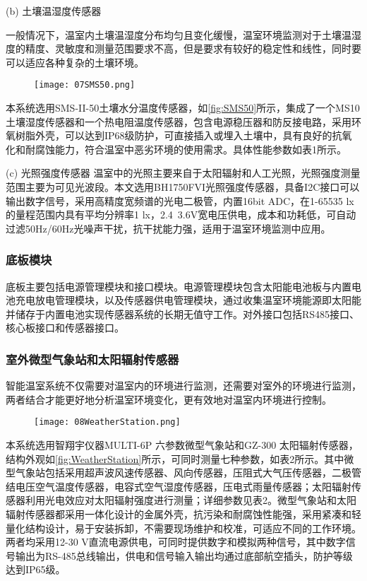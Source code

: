 		(b) 土壤温湿度传感器
		
		一般情况下，温室内土壤温湿度分布均匀且变化缓慢，温室环境监测对于土壤温湿度的精度、灵敏度和测量范围要求不高，但是要求有较好的稳定性和线性，同时要可以适应各种复杂的土壤环境。
  		\begin{figure}[!htp]
  			\centering
 			\texttt{[image: 07SMS50.png]}
		\end{figure}
		本系统选用SMS-II-50土壤水分温度传感器，如\ref{fig:SMS50}所示，集成了一个MS10土壤湿度传感器和一个热电阻温度传感器，包含电源稳压器和防反接电路，采用环氧树脂外壳，可以达到IP68级防护，可直接插入或埋入土壤中，具有良好的抗氧化和耐腐蚀能力，符合温室中恶劣环境的使用需求。具体性能参数如表1所示。

		(c) 光照强度传感器
温室中的光照主要来自于太阳辐射和人工光照，光照强度测量范围主要为可见光波段。本文选用BH1750FVI光照强度传感器，具备I2C接口可以输出数字信号，采用高精度宽频谱的光电二极管，内置16bit ADC，在1-65535 lx的量程范围内具有平均分辨率1 lx，2.4~3.6V宽电压供电，成本和功耗低，可自动过滤50Hz/60Hz光噪声干扰，抗干扰能力强，适用于温室环境监测中应用。

		\subsubsection{底板模块}
		底板主要包括电源管理模块和接口模块。电源管理模块包含太阳能电池板与内置电池充电放电管理模块，以及传感器供电管理模块，通过收集温室环境能源即太阳能并储存于内置电池实现传感器系统的长期无值守工作。对外接口包括RS485接口、核心板接口和传感器接口。	
		
		\subsubsection{室外微型气象站和太阳辐射传感器}
		智能温室系统不仅需要对温室内的环境进行监测，还需要对室外的环境进行监测，两者结合才能更好地分析温室环境变化，更有效地对温室内环境进行控制。
  		\begin{figure}[!htp]
  			\centering
 			\texttt{[image: 08WeatherStation.png]}
		\end{figure}
		本系统选用智翔宇仪器MULTI-6P 六参数微型气象站和GZ-300 太阳辐射传感器，结构外观如\ref{fig:WeatherStation}所示，可同时测量七种参数，如表2所示。其中微型气象站包括采用超声波风速传感器、风向传感器，压阻式大气压传感器，二极管结电压空气温度传感器，电容式空气湿度传感器，压电式雨量传感器；太阳辐射传感器利用光电效应对太阳辐射强度进行测量；详细参数见表2。微型气象站和太阳辐射传感器都采用一体化设计的金属外壳，抗污染和耐腐蚀性能强，采用紧凑和轻量化结构设计，易于安装拆卸，不需要现场维护和校准，可适应不同的工作环境。两者均采用12-30 V直流电源供电，可同时提供数字和模拟两种信号，其中数字信号输出为RS-485总线输出，供电和信号输入输出均通过底部航空插头，防护等级达到IP65级。

